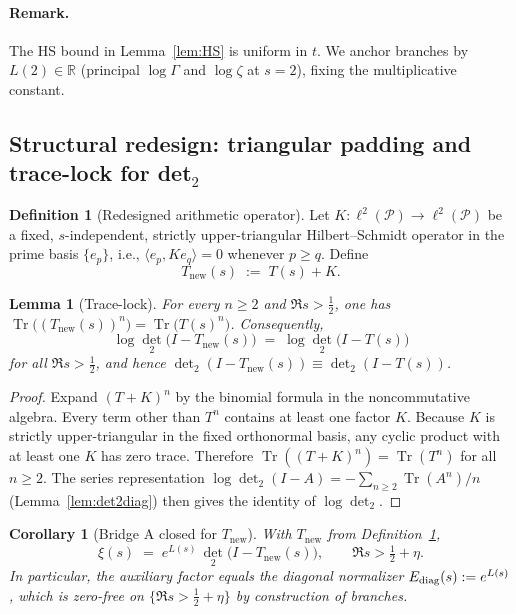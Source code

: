 \documentclass[11pt]{article}
\newtheorem{lemma}[theorem]{Lemma}
\newtheorem{corollary}[theorem]{Corollary}
\theoremstyle{definition}
\newtheorem{definition}[theorem]{Definition}
\theoremstyle{remark}
\newcommand{\PP}{\mathcal{P}}
\DeclareMathOperator{\Tr}{Tr}
\begin{document}
\paragraph{Remark.}
The HS bound in Lemma~\ref{lem:HS} is uniform in $t$. We anchor branches by $L(2)\in\mathbb R$ (principal $\log\Gamma$ and $\log\zeta$ at $s=2$), fixing the multiplicative constant.

\subsection*{Structural redesign: triangular padding and trace-lock for det$_2$}
\begin{definition}[Redesigned arithmetic operator]\label{def:Tnew}
Let $K:\ell^2(\PP)\to\ell^2(\PP)$ be a fixed, $s$-independent, strictly upper-triangular Hilbert--Schmidt operator in the prime basis $\{e_p\}$, i.e., $\langle e_p,Ke_q\rangle=0$ whenever $p\ge q$. Define
\[
  T_{\mathrm{new}}(s)\;:=\;T(s)+K.
\]
\end{definition}

\begin{lemma}[Trace-lock]\label{lem:tracelock}
For every $n\ge 2$ and $\Re s>\tfrac12$, one has $\Tr\big((T_{\mathrm{new}}(s))^{n}\big)=\Tr\big(T(s)^{n}\big)$. Consequently,
\[
  \log\det_{2}\big(I-T_{\mathrm{new}}(s)\big)\;=\;\log\det_{2}\big(I-T(s)\big)
\]
for all $\Re s>\tfrac12$, and hence $\det_{2}(I-T_{\mathrm{new}}(s))\equiv\det_{2}(I-T(s))$.
\end{lemma}
\begin{proof}
Expand $(T+K)^n$ by the binomial formula in the noncommutative algebra. Every term other than $T^n$ contains at least one factor $K$. Because $K$ is strictly upper-triangular in the fixed orthonormal basis, any cyclic product with at least one $K$ has zero trace. Therefore $\Tr((T+K)^n)=\Tr(T^n)$ for all $n\ge 2$. The series representation $\log\det_2(I-A)=-\sum_{n\ge 2}\Tr(A^n)/n$ (Lemma~\ref{lem:det2diag}) then gives the identity of $\log\det_2$.
\end{proof}

\begin{corollary}[Bridge A closed for $T_{\mathrm{new}}$]\label{cor:BA-closed}
With $T_{\mathrm{new}}$ from Definition~\ref{def:Tnew},
\[
  \xi(s)\;=\;e^{L(s)}\,\det_{2}\big(I-T_{\mathrm{new}}(s)\big),\qquad \Re s>\tfrac12+\eta.
\]
In particular, the auxiliary factor equals the diagonal normalizer $E_{\rm diag}(s):=e^{L(s)}$, which is zero-free on $\{\Re s>\tfrac12+\eta\}$ by construction of branches.
\end{corollary}
\end{document}
